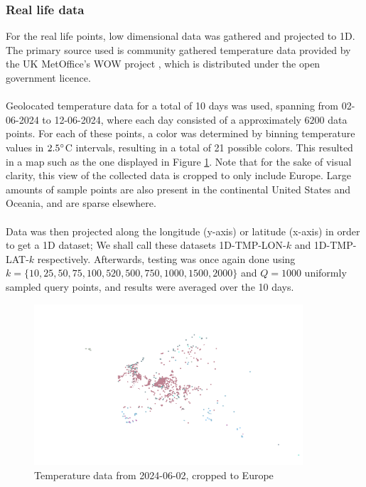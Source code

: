 \documentclass{article}
\newcommand{\fb}[1]{{#1}}
\begin{document}
\subsubsection*{Real life data}
For the real life points, low dimensional data was gathered and projected to 1D. The primary source used is community gathered temperature data provided by the UK MetOffice's WOW project \cite{Met}, which is distributed under the open government licence. \\\\
Geolocated temperature data for a total of 10 days was used, spanning from 02-06-2024 to 12-06-2024, where each day consisted of a approximately $6200$ data points. For each of these points, a color was determined by binning temperature values in $2.5\degree$C intervals, \fb{resulting in a total of 21 possible colors}. This resulted in a map such as the one displayed in Figure \ref{fig:temp-data}. Note that for the sake of visual clarity, this view of the collected data is cropped to only include Europe. Large amounts of sample points are also present in the continental United States and Oceania, and are sparse elsewhere. \\\\
Data was then projected along the longitude (y-axis) or latitude (x-axis) in order to get a 1D dataset; We shall call these datasets 1D-TMP-LON-$k$ and 1D-TMP-LAT-$k$ respectively. Afterwards, testing was once again done using $k=\{10, 25, 50, 75, 100, 520, 500, 750, 1000, 1500, 2000\}$ and $Q=1000$ uniformly sampled query points, and results were averaged over the 10 days.
\begin{figure}
    \centering
    \includegraphics[width=10cm]{figs/temperature-02-06-2024-cropped.png}
    \caption{Temperature data from 2024-06-02, cropped to Europe}
    \label{fig:temp-data}
\end{figure}
\end{document}
